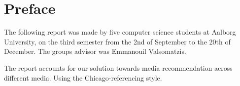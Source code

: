 \chapter*{Preface}
The following report was made by five computer science students at Aalborg University, on the third semester from the 2nd of September to the 20th of December. The groups advisor was Emmanouil Valsomatzis.


The report accounts for our solution towards media recommendation across different media. Using the Chicago-referencing style.

